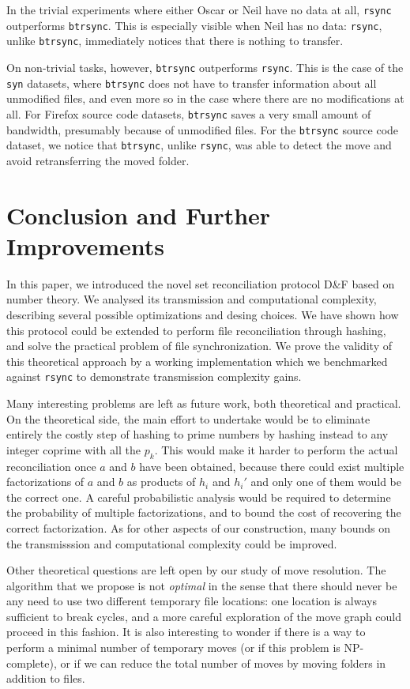 \documentclass[twoside,envcountsame,runningheads]{llncs}
\newcommand{\df}{D\&F\xspace}
\newcommand{\btrsync}{\texttt{btrsync}\xspace}
\newcommand{\rsync}{\texttt{rsync}\xspace}
\begin{document}
In the trivial experiments where either Oscar or Neil have no data at all, \rsync outperforms \btrsync. This is especially visible when Neil has no data: \rsync, unlike \btrsync, immediately notices that there is nothing to transfer.

On non-trivial tasks, however, \btrsync outperforms \rsync. This is the case of the {\tt syn} datasets, where \btrsync does not have to transfer
information about all unmodified files, and even more so in the case where there are no modifications at all. For Firefox source code datasets, \btrsync saves a very small amount of bandwidth, presumably because of unmodified files. For the \btrsync source code dataset, we notice that \btrsync, unlike \rsync, was able to detect the move and avoid retransferring the moved folder.


\section{Conclusion and Further Improvements}

In this paper, we introduced the novel set reconciliation protocol \df based on number theory. We analysed its transmission and computational complexity, describing several possible optimizations and desing choices. We have shown how this protocol could be extended to perform file reconciliation through hashing, and solve the practical problem of file synchronization. We prove the validity of this theoretical approach by a working implementation which we benchmarked against \rsync to demonstrate transmission complexity gains.

Many interesting problems are left as future work, both theoretical and practical. On the theoretical side, the main effort to undertake would be to eliminate entirely the costly step of hashing to prime numbers by hashing instead to any integer coprime with all the $p_k$. This would make it harder to perform the actual reconciliation once $a$ and $b$ have been obtained, because there could exist multiple factorizations of $a$ and $b$ as products of $h_i$ and $h_i'$ and only one of them would be the correct one. A careful probabilistic analysis would be required to determine the probability of multiple factorizations, and to bound the cost of recovering the correct factorization.
As for other aspects of our construction, many bounds on the transmisssion and computational complexity could be improved.

Other theoretical questions are left open by our study of move resolution. The algorithm that we propose is not \emph{optimal} in the sense that there should never be any need to use two different temporary file locations: one location is always sufficient to break cycles, and a more careful exploration of the move graph could proceed in this fashion. It is also interesting to wonder if there is a way to perform a minimal number of temporary moves (or if this problem is NP-complete), or if we can reduce the total number of moves by moving folders in addition to files.
\end{document}
